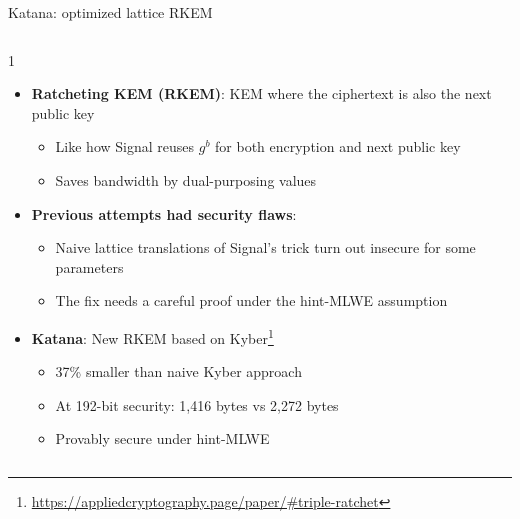 \ifdefined\PRESENTATION\else\PassOptionsToClass{handout}{beamer}\fi\documentclass[aspectratio=169, lualatex]{beamer}
\begin{document}
\begin{frame}{Katana: optimized lattice RKEM}
	\begin{columns}[c]
		\begin{column}{1\textwidth}
			\begin{itemize}
				\item \textbf{Ratcheting KEM (RKEM)}: KEM where the ciphertext is also the next public key
				      \begin{itemize}
					      \item Like how Signal reuses $g^b$ for both encryption and next public key
					      \item Saves bandwidth by dual-purposing values
				      \end{itemize}
				\item \textbf{Previous attempts had security flaws}:
				      \begin{itemize}
					      \item Naive lattice translations of Signal's trick turn out insecure for some parameters
					      \item The fix needs a careful proof under the hint-MLWE assumption
				      \end{itemize}
				\item \textbf{Katana}: New RKEM based on Kyber\footnote{\url{https://appliedcryptography.page/paper/\#triple-ratchet}}
				      \begin{itemize}
					      \item 37\% smaller than naive Kyber approach
					      \item At 192-bit security: 1,416 bytes vs 2,272 bytes
					      \item Provably secure under hint-MLWE
				      \end{itemize}
			\end{itemize}
		\end{column}
	\end{columns}
\end{frame}
\end{document}
